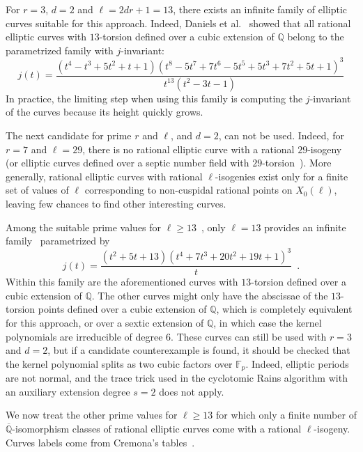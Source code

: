 \documentclass[12pt]{article}
\theoremstyle{plain}
\theoremstyle{definition}
\def\Q{\ensuremath{\mathbb{Q}}}
\def\F{\ensuremath{\mathbb{F}}}
\newcounter{algorithm}
\begin{document}
For $r = 3$, $d = 2$ and $\ell = 2 d r + 1 = 13$, there exists an
infinite family of elliptic curves suitable for this approach.
Indeed, Daniels et al.~\cite{daniels_torsion_2015} showed that
all rational elliptic curves with $13$-torsion defined over a cubic extension
of $\Q$ belong to the parametrized family with $j$-invariant:
\[
j(t)=\frac{\left(t^4-t^3+5 t^2 + t + 1\right) \left(t^8 - 5 t^7 + 7 t^6 - 5 t^5 + 5 t^3 + 7 t^2 + 5 t + 1\right)^3}{t^{13} \left(t^2 -3 t - 1\right)}
\]
In practice, the limiting step when using this family is computing
the $j$-invariant of the curves because its height quickly grows.

The next candidate for prime $r$ and $\ell$, and $d = 2$, can not be used.
Indeed, for $r = 7$ and $\ell = 29$, there is no rational elliptic curve
with a rational $29$-isogeny~\cite{Mazur1974} (or elliptic curves defined
over a septic number field with $29$-torsion~\cite{Derickx201452}).
More generally, rational elliptic curves with rational $\ell$-isogenies
exist only for a finite set of values of $\ell$ corresponding
to non-cuspidal rational points on $X_0(\ell)$, leaving few chances
to find other interesting curves.

Among the suitable prime values for $\ell \geq 13$~\cite{Mazur1974},
only $\ell = 13$ provides an infinite family~\cite{Lozano-Robledo2013}
parametrized by
\[
j(t) = \frac{\left(t^2 + 5t + 13\right)\left(t^4 + 7t^3 + 20t^2 + 19t + 1\right)^3}{t} \enspace .
\]
Within this family are the aforementioned curves with $13$-torsion
defined over a cubic extension of $\Q$.
The other curves might only have the abscissae of the $13$-torsion points
defined over a cubic extension of $\Q$,
which is completely equivalent for this approach,
or over a sextic extension of $\Q$,
in which case the kernel polynomials are irreducible of degree $6$.
These curves can still be used with $r = 3$ and $d = 2$,
but if a candidate counterexample is found, it should be checked
that the kernel polynomial splits as two cubic factors over $\F_p$.
Indeed, elliptic periods are not normal, and the trace trick used
in the cyclotomic Rains algorithm with an auxiliary extension degree
$s = 2$ does not apply.

We now treat the other prime values for $\ell \geq 13$
for which only a finite number of $\overline{\Q}$-isomorphism
classes of rational elliptic curves come with a rational $\ell$-isogeny.
Curves labels come from Cremona's tables~\cite{cremona_tables}.
\end{document}
